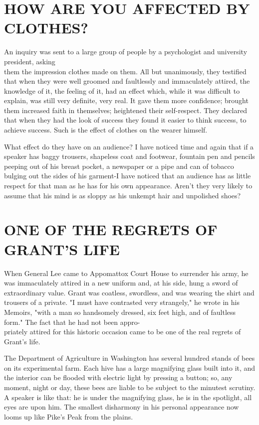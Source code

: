 \documentclass[10pt]{article}
\begin{document}
\section*{HOW ARE YOU AFFECTED BY CLOTHES?}
An inquiry was sent to a large group of people by a psychologist and university president, asking\\
them the impression clothes made on them. All but unanimously, they testified that when they were well groomed and faultlessly and immaculately attired, the knowledge of it, the feeling of it, had an effect which, while it was difficult to explain, was still very definite, very real. It gave them more confidence; brought them increased faith in themselves; heightened their self-respect. They declared that when they had the look of success they found it easier to think success, to achieve success. Such is the effect of clothes on the wearer himself.

What effect do they have on an audience? I have noticed time and again that if a speaker has baggy trousers, shapeless coat and footwear, fountain pen and pencils peeping out of his breast pocket, a newspaper or a pipe and can of tobacco bulging out the sides of his garment-I have noticed that an audience has as little respect for that man as he has for his own appearance. Aren't they very likely to assume that his mind is as sloppy as his unkempt hair and unpolished shoes?

\section*{ONE OF THE REGRETS OF GRANT'S LIFE}
When General Lee came to Appomattox Court House to surrender his army, he was immaculately attired in a new uniform and, at his side, hung a sword of extraordinary value. Grant was coatless, swordless, and was wearing the shirt and trousers of a private. "I must have contrasted very strangely," he wrote in his Memoirs, "with a man so handsomely dressed, six feet high, and of faultless form." The fact that he had not been appro-\\
priately attired for this historic occasion came to be one of the real regrets of Grant's life.

The Department of Agriculture in Washington has several hundred stands of bees on its experimental farm. Each hive has a large magnifying glass built into it, and the interior can be flooded with electric light by pressing a button; so, any moment, night or day, these bees are liable to be subject to the minutest scrutiny. A speaker is like that: he is under the magnifying glass, he is in the spotlight, all eyes are upon him. The smallest disharmony in his personal appearance now looms up like Pike's Peak from the plains.
\end{document}
